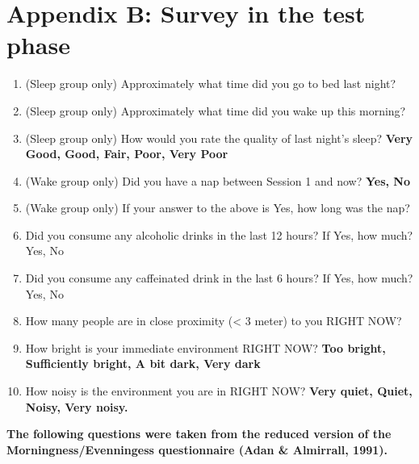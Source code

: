 \documentclass[
]{article}
\begin{document}
\hypertarget{appendix-b-survey-in-the-test-phase}{%
\section*{Appendix B: Survey in the test phase}\label{appendix-b-survey-in-the-test-phase}}

\begin{enumerate}
\def\labelenumi{\arabic{enumi}.}
\item
  (Sleep group only) Approximately what time did you go to bed last night?
\item
  (Sleep group only) Approximately what time did you wake up this morning?
\item
  (Sleep group only) How would you rate the quality of last night's sleep?
  \textbf{Very Good, Good, Fair, Poor, Very Poor}
\item
  (Wake group only) Did you have a nap between Session 1 and now?
  \textbf{Yes, No}
\item
  (Wake group only) If your answer to the above is Yes, how long was the nap?
\item
  Did you consume any alcoholic drinks in the last 12 hours? If Yes, how much?
  Yes, No
\item
  Did you consume any caffeinated drink in the last 6 hours? If Yes, how much?
  Yes, No
\item
  How many people are in close proximity (\textless{} 3 meter) to you RIGHT NOW?
\item
  How bright is your immediate environment RIGHT NOW?
  \textbf{Too bright, Sufficiently bright, A bit dark, Very dark}
\item
  How noisy is the environment you are in RIGHT NOW?
  \textbf{Very quiet, Quiet, Noisy, Very noisy.}
\end{enumerate}

\textbf{The following questions were taken from the reduced version of the Morningness/Evenningess questionnaire (Adan \& Almirrall, 1991).}
\end{document}
